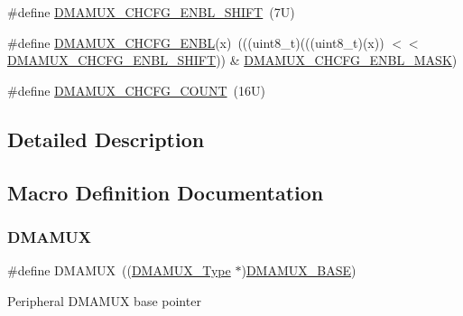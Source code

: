 \begin{DoxyCompactItemize}
\item 
\#define \mbox{\hyperlink{group___d_m_a_m_u_x___register___masks_ga23d6f41370761b5c68e4d49f419aaee9}{D\+M\+A\+M\+U\+X\+\_\+\+C\+H\+C\+F\+G\+\_\+\+E\+N\+B\+L\+\_\+\+S\+H\+I\+FT}}~(7\+U)
\item 
\#define \mbox{\hyperlink{group___d_m_a_m_u_x___register___masks_gaa2db13a0c108bf15d36830b42495686c}{D\+M\+A\+M\+U\+X\+\_\+\+C\+H\+C\+F\+G\+\_\+\+E\+N\+BL}}(x)~(((uint8\+\_\+t)(((uint8\+\_\+t)(x)) $<$$<$ \mbox{\hyperlink{group___d_m_a_m_u_x___register___masks_ga23d6f41370761b5c68e4d49f419aaee9}{D\+M\+A\+M\+U\+X\+\_\+\+C\+H\+C\+F\+G\+\_\+\+E\+N\+B\+L\+\_\+\+S\+H\+I\+FT}})) \& \mbox{\hyperlink{group___d_m_a_m_u_x___register___masks_ga311ccb0a9a00f29da44f8c41b33ba79f}{D\+M\+A\+M\+U\+X\+\_\+\+C\+H\+C\+F\+G\+\_\+\+E\+N\+B\+L\+\_\+\+M\+A\+SK}})
\item 
\#define \mbox{\hyperlink{group___d_m_a_m_u_x___register___masks_ga142bd4d929a1397622dd8a716558f3bb}{D\+M\+A\+M\+U\+X\+\_\+\+C\+H\+C\+F\+G\+\_\+\+C\+O\+U\+NT}}~(16\+U)
\end{DoxyCompactItemize}


\subsection{Detailed Description}


\subsection{Macro Definition Documentation}
\mbox{\label{group___d_m_a_m_u_x___register___masks_ga0b7b7bd666a76aa791434bb59ea03693}} 
\subsubsection{\texorpdfstring{D\+M\+A\+M\+UX}{DMAMUX}}
{\footnotesize\ttfamily \#define D\+M\+A\+M\+UX~((\mbox{\hyperlink{struct_d_m_a_m_u_x___type}{D\+M\+A\+M\+U\+X\+\_\+\+Type}} $\ast$)\mbox{\hyperlink{group___d_m_a_m_u_x___register___masks_gab59b16200deae0e15cd58d322b7cc75b}{D\+M\+A\+M\+U\+X\+\_\+\+B\+A\+SE}})}

Peripheral D\+M\+A\+M\+UX base pointer \mbox{\label{group___d_m_a_m_u_x___register___masks_gab59b16200deae0e15cd58d322b7cc75b}} 

